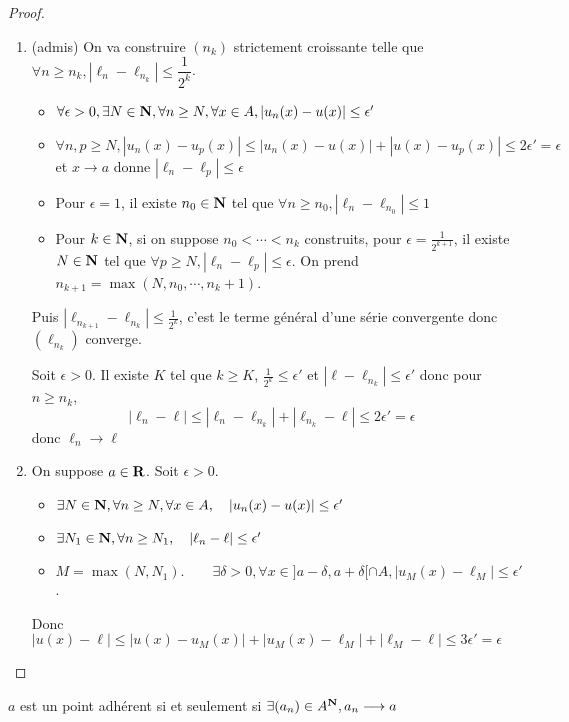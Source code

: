 \begin{proof}~
\begin{enumerate}
    \item (admis) On va construire $(n_k)$ strictement croissante telle que  $ \forall  n\geq n_k, |\ell _n-\ell _{n_k}| \leq  \dfrac{1}{2^k}$. \begin{itemize}
        \item $\forall \epsilon>0, \exists  N \in  \mathbf N, \forall  n\geq N, \forall  x \in  A, |u_n(x)-u(x)|\leq \epsilon'$
        \item $\forall  n, p\geq N, |u_n(x)-u_p(x)|\leq |u_n(x)-u(x)|+|u(x)-u_p(x)|\leq 2\epsilon'=\epsilon$ et $x \longrightarrow a$ donne  $|\ell _n-\ell _p|\leq \epsilon$
        \item Pour $\epsilon=1$, il existe  $n_0 \in  \mathbf N$ tel que $\forall n\geq n_0, |\ell _n-\ell _{n_0}|\leq 1$
        \item Pour $k \in  \mathbf N$, si on suppose $n_0<\cdots <n_k$ construits, pour $\epsilon=\frac{1}{2^{k+1}}$, il existe $N \in  \mathbf N$ tel que $\forall  p \geq N, |\ell  _n-\ell _p|\leq \epsilon$. On prend $n_{k+1}=\max(N, n_0,\cdots , n_k+1)$.
    \end{itemize}
    Puis $|\ell _{n_{k+1}}-\ell _{n_k}|\leq \frac{1}{2^k}$, c'est le terme général d'une série convergente donc $(\ell _{n_k})$ converge.

     Soit $\epsilon>0$. Il existe $K$ tel que  $k\geq K$, $\frac{1}{2^k}\leq \epsilon'$ et $|\ell  -\ell _{n_k}|\leq \epsilon'$ donc pour $n\geq n_k$, \[
    |\ell _n-\ell |\leq |\ell _n-\ell _{n_k}|+|\ell _{n_k}-\ell |\leq 2\epsilon'=\epsilon
    \] 
    donc $\ell _n \longrightarrow \ell $ 
\item On suppose $a \in  \mathbf R$. Soit $\epsilon>0$.  \begin{itemize}
    \item $\exists N \in  \mathbf N, \forall  n \geq  N, \forall  x \in  A, \quad  |u_n(x)-u(x)|\leq \epsilon'$
    \item $\exists N_1 \in  \mathbf N, \forall  n\geq N_1, \quad  |\ell _n-\ell |\leq \epsilon'$
    \item $M=\max(N, N_1). \qquad  \exists \delta>0, \forall  x \in  ]a-\delta, a+\delta[\cap A, |u_M(x)-\ell _M|\leq \epsilon'$.
\end{itemize}
Donc $|u(x)-\ell |\leq |u(x)-u_M(x)|+|u_M(x)-\ell _M| + |\ell _M-\ell |\leq 3\epsilon'=\epsilon$
\end{enumerate}
\end{proof}

\begin{rem}
    $a$ est un point adhérent  si et seulement si $ \exists  (a_n) \in  A^{\mathbf N}, a_n \longrightarrow a$
\end{rem}

